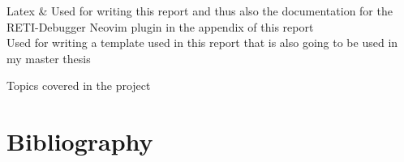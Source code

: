 \documentclass{report}
\begin{document}
\begin{table}[H]
\begin{tblr}
		Latex                  & {\hspace{\dimexpr\labelsep+0.5\tabcolsep}Used for writing this report and thus also the documentation for the RETI-Debugger Neovim plugin in the appendix of this report                                                                                                                  \\\hspace{\dimexpr\labelsep+0.5\tabcolsep}Used for writing a template used in this report that is also going to be used in my master thesis}\\
	\end{tblr}
	\caption{Topics covered in the project}
	\label{tab:topics}
\end{table}

\chapter{Bibliography}
\printbibliography[heading=none]
\end{document}

